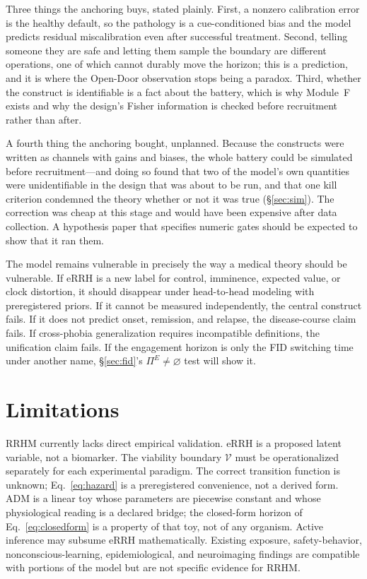 \documentclass[9pt,twocolumn]{article}
\newcommand{\Vset}{\mathcal{V}}
\begin{document}
Three things the anchoring buys, stated plainly. First, a nonzero calibration error is the healthy default, so the pathology is a cue-conditioned bias and the model predicts residual miscalibration even after successful treatment. Second, telling someone they are safe and letting them sample the boundary are different operations, one of which cannot durably move the horizon; this is a prediction, and it is where the Open-Door observation stops being a paradox. Third, whether the construct is identifiable is a fact about the battery, which is why Module~F exists and why the design's Fisher information is checked before recruitment rather than after.

A fourth thing the anchoring bought, unplanned. Because the constructs were written as channels with gains and biases, the whole battery could be simulated before recruitment---and doing so found that two of the model's own quantities were unidentifiable in the design that was about to be run, and that one kill criterion condemned the theory whether or not it was true (\S\ref{sec:sim}). The correction was cheap at this stage and would have been expensive after data collection. A hypothesis paper that specifies numeric gates should be expected to show that it ran them.

The model remains vulnerable in precisely the way a medical theory should be vulnerable. If eRRH is a new label for control, imminence, expected value, or clock distortion, it should disappear under head-to-head modeling with preregistered priors. If it cannot be measured independently, the central construct fails. If it does not predict onset, remission, and relapse, the disease-course claim fails. If cross-phobia generalization requires incompatible definitions, the unification claim fails. If the engagement horizon is only the FID switching time under another name, \S\ref{sec:fid}'s $\Pi^E\neq\varnothing$ test will show it.

\section{Limitations}
\label{sec:limits}
RRHM currently lacks direct empirical validation. eRRH is a proposed latent variable, not a biomarker. The viability boundary $\Vset$ must be operationalized separately for each experimental paradigm. The correct transition function is unknown; Eq.~\ref{eq:hazard} is a preregistered convenience, not a derived form. ADM is a linear toy whose parameters are piecewise constant and whose physiological reading is a declared bridge; the closed-form horizon of Eq.~\ref{eq:closedform} is a property of that toy, not of any organism. Active inference may subsume eRRH mathematically. Existing exposure, safety-behavior, nonconscious-learning, epidemiological, and neuroimaging findings are compatible with portions of the model but are not specific evidence for RRHM.
\end{document}
